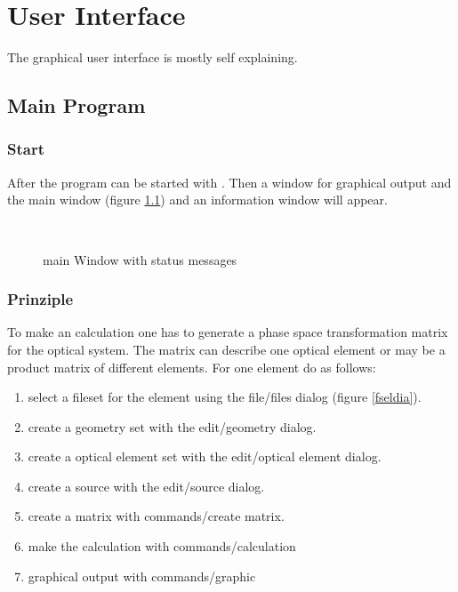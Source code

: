 

\chapter{User Interface}
The graphical user interface is mostly self explaining. 
\section {Main Program}
\subsection{Start}
After  the program can be started with . Then a
window for graphical output and the main window (figure \ref{mw}) and an
information window will appear.
\begin{figure}
\centerline{ \hbox{
 }}  
  \caption {\label{mw} \phase main Window with status messages} 
\end {figure}     

\subsection {Prinziple}
To make an calculation one has to generate a phase space transformation matrix
for the optical system. The matrix can describe one optical element or may be a
product matrix of different elements.
For one element do as follows:  
\begin{enumerate} 
\item select a fileset for the element using the file/files dialog (figure 
\ref{fseldia}).
\item create a geometry set with the edit/geometry dialog.
\item create a optical element set with the edit/optical element dialog.    
\item create a source with the edit/source dialog.    
\item create a matrix with commands/create matrix.
\item make the calculation with commands/calculation
\item graphical output with commands/graphic
\end {enumerate}

